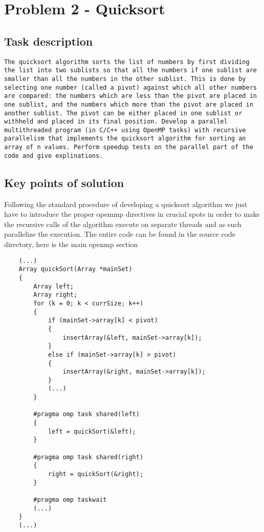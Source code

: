 \documentclass[a4paper,11pt]{article}
\begin{document}
\section*{Problem 2 - Quicksort}

\subsection*{Task description}

\begin{verbatim}
The quicksort algorithm sorts the list of numbers by first dividing the list into two sublists so that all the numbers if one sublist are smaller than all the numbers in the other sublist. This is done by selecting one number (called a pivot) against which all other numbers are compared: the numbers which are less than the pivot are placed in one sublist, and the numbers which more than the pivot are placed in another sublist. The pivot can be either placed in one sublist or withheld and placed in its final position. Develop a parallel multithreaded program (in C/C++ using OpenMP tasks) with recursive parallelism that implements the quicksort algorithm for sorting an array of n values. Perform speedup tests on the parallel part of the code and give explinations.
\end{verbatim}

\subsection*{Key points of solution}

Following the standard procedure of developing a quicksort algorithm we just have to introduce the proper opemmp directives in crucial spots in order to make the recursive calls of the algorithm execute on separate threads and as such parallelize the execution. The entire code can be found in the source code directory, here is the main openmp section

\begin{verbatim}
    (...)
    Array quickSort(Array *mainSet)
    {
        Array left;
        Array right;
        for (k = 0; k < currSize; k++)
        {
            if (mainSet->array[k] < pivot)
            {
                insertArray(&left, mainSet->array[k]);
            }
            else if (mainSet->array[k] > pivot)
            {
                insertArray(&right, mainSet->array[k]);
            }
            (...)
        }
        
        #pragma omp task shared(left)
        {
            left = quickSort(&left);
        }
        
        #pragma omp task shared(right)
        {
            right = quickSort(&right);
        }
        
        #pragma omp taskwait
        (...)
    }
    (...)
\end{verbatim}
\end{document}
